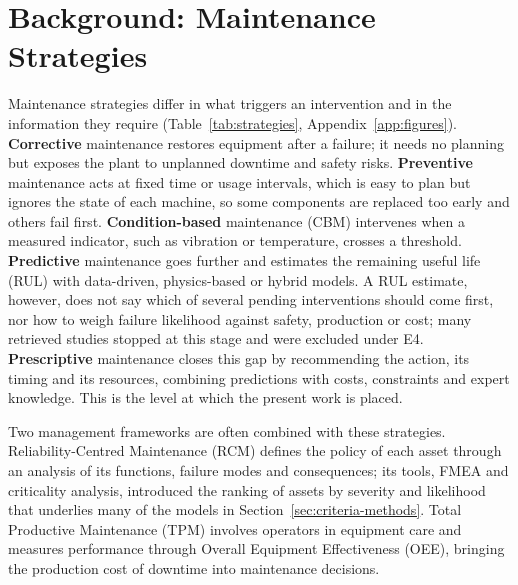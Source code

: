 \section{Background: Maintenance Strategies}
\label{sec:background}

Maintenance strategies differ in what triggers an intervention and in the information they require (Table~\ref{tab:strategies}, Appendix~\ref{app:figures}). \textbf{Corrective} maintenance restores equipment after a failure; it needs no planning but exposes the plant to unplanned downtime and safety risks. \textbf{Preventive} maintenance acts at fixed time or usage intervals, which is easy to plan but ignores the state of each machine, so some components are replaced too early and others fail first. \textbf{Condition-based} maintenance (CBM) intervenes when a measured indicator, such as vibration or temperature, crosses a threshold. \textbf{Predictive} maintenance goes further and estimates the remaining useful life (RUL) with data-driven, physics-based or hybrid models. A RUL estimate, however, does not say which of several pending interventions should come first, nor how to weigh failure likelihood against safety, production or cost; many retrieved studies stopped at this stage and were excluded under E4. \textbf{Prescriptive} maintenance closes this gap by recommending the action, its timing and its resources, combining predictions with costs, constraints and expert knowledge. This is the level at which the present work is placed.

Two management frameworks are often combined with these strategies. Reli\-a\-bil\-i\-ty-Centred Maintenance (RCM) defines the policy of each asset through an analysis of its functions, failure modes and consequences; its tools, FMEA and criticality analysis, introduced the ranking of assets by severity and likelihood that underlies many of the models in Section~\ref{sec:criteria-methods}. Total Productive Maintenance (TPM) involves operators in equipment care and measures performance through Overall Equipment Effectiveness (OEE), bringing the production cost of downtime into maintenance decisions.